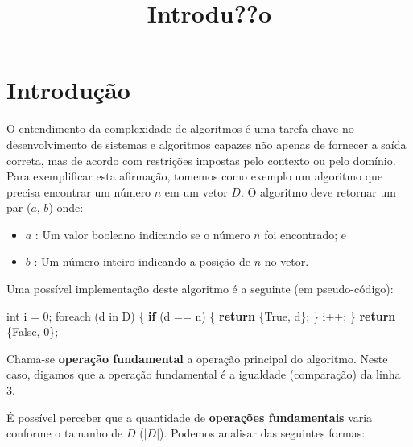 \documentclass{article}
\title{Introdu??o}
\newenvironment{Shaded}{}{}
\newcommand{\KeywordTok}[1]{\textcolor[rgb]{0.00,0.44,0.13}{\textbf{{#1}}}}
\newcommand{\DataTypeTok}[1]{\textcolor[rgb]{0.56,0.13,0.00}{{#1}}}
\newcommand{\DecValTok}[1]{\textcolor[rgb]{0.25,0.63,0.44}{{#1}}}
\newcommand{\FunctionTok}[1]{\textcolor[rgb]{0.02,0.16,0.49}{{#1}}}
\newcommand{\NormalTok}[1]{{#1}}
\begin{document}
    
    
    \maketitle
    
    

    

    \section{Introdução}


    O entendimento da complexidade de algoritmos é uma tarefa chave no
desenvolvimento de sistemas e algoritmos capazes não apenas de fornecer
a saída correta, mas de acordo com restrições impostas pelo contexto ou
pelo domínio. Para exemplificar esta afirmação, tomemos como exemplo um
algoritmo que precisa encontrar um número \(n\) em um vetor \(D\). O
algoritmo deve retornar um par (\(a\), \(b\)) onde:

\begin{itemize}
\itemsep1pt\parskip0pt
\item
  \(a\) : Um valor booleano indicando se o número \(n\) foi encontrado;
  e
\item
  \(b\) : Um número inteiro indicando a posição de \(n\) no vetor.
\end{itemize}

Uma possível implementação deste algoritmo é a seguinte (em
pseudo-código):

    \begin{Shaded}
\begin{Highlighting}[]
\DataTypeTok{int} \NormalTok{i = }\DecValTok{0}\NormalTok{; }
\FunctionTok{foreach} \NormalTok{(d in D) \{}
      \KeywordTok{if} \NormalTok{(d == n) \{}
          \KeywordTok{return} \NormalTok{\{True, d\};}
      \NormalTok{\}}
      \NormalTok{i++;}
\NormalTok{\}}
\KeywordTok{return} \NormalTok{\{False, }\DecValTok{0}\NormalTok{\};}
\end{Highlighting}
\end{Shaded}

    Chama-se \textbf{operação fundamental} a operação principal do
algoritmo. Neste caso, digamos que a operação fundamental é a igualdade
(comparação) da linha 3.

É possível perceber que a quantidade de \textbf{operações fundamentais}
varia conforme o tamanho de \(D\) (\(|D|\)). Podemos analisar das
seguintes formas:
\end{document}
